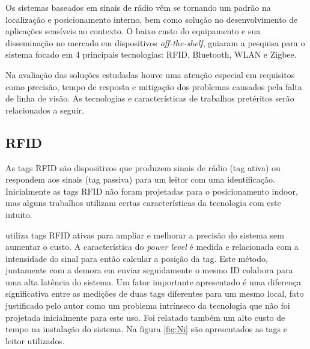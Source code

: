 Os sistemas baseados em sinais de rádio vêm se tornando um padrão na localização e posicionamento interno, bem como solução no desenvolvimento de aplicações sensíveis ao contexto. O baixo custo do equipamento e sua disseminação no mercado em dispositivos \textit{off-the-shelf}, guiaram a pesquisa para o sistema focado em 4 principais tecnologias: RFID, Bluetooth, WLAN e Zigbee.


Na avaliação das soluções estudadas houve uma atenção especial em requisitos como precisão, tempo de resposta e mitigação dos problemas causados pela falta de linha de visão. As tecnologias e características de trabalhos pretéritos serão relacionados a seguir.


\subsection*{RFID}
As tags RFID são dispositivos que produzem sinais de rádio (tag ativa) ou respondem aos sinais (tag passiva) para um leitor com uma identificação. Inicialmente as tags RFID não foram projetadas para o posicionamento indoor, mas alguns trabalhos utilizam certas características da tecnologia com este intuito.

\cite{Ni2004} utiliza tags RFID ativas para ampliar e melhorar a precisão do sistema sem aumentar o custo. A característica do \textit{power level} é medida e relacionada com a intensidade do sinal para então calcular a posição da tag. Este método, juntamente com a demora em enviar seguidamente o mesmo ID colabora para uma alta latência do sistema. Um fator importante apresentado é uma diferença significativa entre as medições de duas tags diferentes para um mesmo local, fato justificado pelo autor como um problema intrínseco da tecnologia que não foi projetada inicialmente para este uso. Foi relatado também um alto custo de tempo na instalação do sistema. Na figura \ref{fig:Ni} são apresentados as tags e leitor utilizados.

